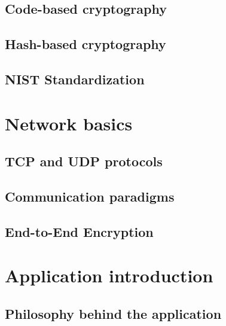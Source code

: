 \section{Code-based cryptography}
\label{sec:code_based_crypto}


\section{Hash-based cryptography}
\label{sec:hash_based_crypto}


\section{NIST Standardization}
\label{sec:nist}


\chapter{Network basics}
\label{ch:network_baics}


\section{TCP and UDP protocols}
\label{sec:tcp_and_udp}


\section{Communication paradigms}
\label{sec:comm_paradigms}


\section{End-to-End Encryption}
\label{sec:e2e}


\chapter{Application introduction}
\label{ch:app_intro}


\section{Philosophy behind the application}
\label{sec:philo_behind_app}


